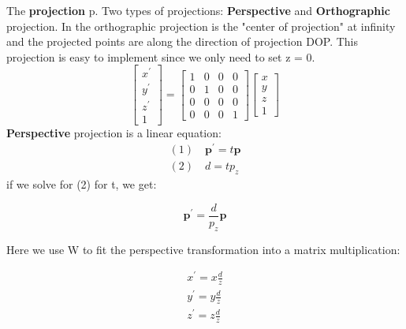 		\noindent The \textbf{projection} p. Two types of projections: \textbf{Perspective} and \textbf{Orthographic} projection. In the orthographic projection is the "center of projection" at infinity and the projected points are along the direction of projection DOP. This projection is easy to implement since we only need to set z = 0. 
			\begin{equation}
		 		\begin{bmatrix} x^{\prime} \\ y^{\prime} \\z^{\prime} \\ 1 \end{bmatrix} = \begin{bmatrix} 1& 0& 0& 0\\ 
		 		                0& 1& 0& 0\\
		 		                0& 0& 0& 0\\
		 		                0& 0& 0& 1\end{bmatrix} \begin{bmatrix} x \\ y \\ z \\ 1 \end{bmatrix}
		 	\end{equation} 
		 \noindent \textbf{Perspective} projection is a linear equation:
			 \begin{equation}
			 \begin{aligned}
			 	(1) \quad \textbf{p}^{\prime} = t \textbf{p} \\
			 	(2) \quad d = tp_z
			 \end{aligned}
			 \end{equation}
		if we solve for  (2) for t, we get:

			\begin{equation}
				\textbf{p}^{\prime} = \frac{d}{p_z} \textbf{p} 
			\end{equation}

		Here we use W to fit the perspective transformation into a matrix multiplication:

			\begin{equation}
			\begin{aligned}
				x^{\prime} = x \frac{d} {z}\\
				y^{\prime} = y \frac{d} {z}\\
				z^{\prime} = z \frac{d} {z}  
			\end{aligned}
			\end{equation}


